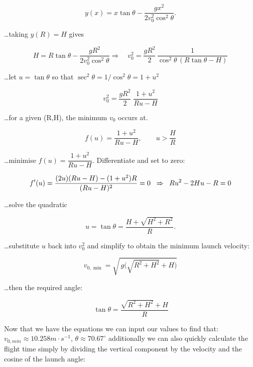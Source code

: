 \documentclass[a4paper,10pt]{article} %
\begin{document}
\begin{equation}
y(x)=x\tan\theta-\frac{g x^{2}}{2 v_0^{2}\cos^{2}\theta}.
\end{equation}

\ldots taking \(y(R)=H\) gives

\begin{equation*}
H = R\tan\theta-\frac{g R^{2}}{2 v_0^{2}\cos^{2}\theta}
\Rightarrow\quad
v_0^{2} = \frac{g R^{2}}{2}\,\frac{1}{\cos^{2}\theta\,(R\tan\theta-H)}
\end{equation*}

\ldots let \(u=\tan\theta\) so that \(\sec^{2}\theta=1/\cos^{2}\theta=1+u^{2}\)

\begin{equation*}
v_0^{2}=\frac{g R^{2}}{2}\;\frac{1+u^{2}}{R u - H}
\end{equation*}

\ldots for a given (R,H), the minimum $v_0$ occurs at.

\begin{equation*}
    f(u) = \frac{1 + u^2}{Ru-H}, \qquad u>\frac{H}{R}
\end{equation*}

\ldots minimise \(f(u)=\dfrac{1+u^{2}}{R u - H}\). Differentiate and set to zero:

\medskip

\begin{equation*}
    f'(u)=\frac{(2u)(Ru-H)-(1+u^{2})R}{(Ru-H)^{2}}=0
    \;\;\Rightarrow\;\; Ru^{2}-2Hu-R=0 \\
\end{equation*}

\ldots solve the quadratic

\begin{equation*}
u=\tan\theta
= \frac{H+\sqrt{H^{2}+R^{2}}}{R}.
\end{equation*}

\ldots substitute \(u\) back into \(v_0^{2}\) and simplify to obtain the minimum launch velocity:

\begin{equation}
\boxed{\,v_{0,\min}=\sqrt{\,g\big(\sqrt{R^{2}+H^{2}}+H\big)}\,}
\end{equation}

\ldots then the required angle:

\begin{equation}
\boxed{\,\tan\theta=\dfrac{\sqrt{R^{2}+H^{2}}+H}{R}}
\end{equation}

Now that we have the equations we can input our values to find that: $v_{0,min} \approx 10.258 m\cdot s^{-1}$, $\theta \approx 70.67 ^\circ$ additionally we can also quickly calculate the flight time simply by dividing the vertical component by the velocity and the cosine of the launch angle:
\end{document}
